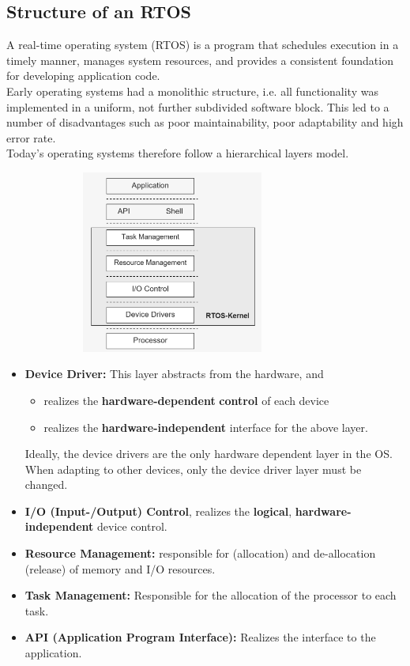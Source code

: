 \subsection{Structure of an RTOS}

A real-time operating system (RTOS) is a program that schedules execution in a timely manner, manages system resources, and provides a consistent foundation for developing application code.\\

Early operating systems had a monolithic structure, i.e. all functionality was implemented in a uniform, not further subdivided software block. This led to a number of disadvantages such as poor maintainability, poor adaptability and high error rate.\\

Today's operating systems therefore follow a hierarchical layers model. 

	\begin{figure}[h]
    \centering
    \includegraphics[width=9cm, height=6cm]{Images/image79.png}
    \label{fig:Fig }
    \end{figure}

\begin{itemize}
	\item  \textbf{Device Driver: } This layer abstracts from the hardware, and
	\begin{itemize}
		\item realizes the \textbf{hardware-dependent} \textbf{control} of each device
		\item realizes the \textbf{hardware-independent} interface for the above layer. 
	\end{itemize}

		Ideally, the device drivers are the only hardware dependent layer in the OS. When adapting to other devices, only the device driver layer must be changed.
	\item  \textbf{I/O (Input-/Output) Control}, realizes the \textbf{logical}, \textbf{hardware-independent} device control. 
	\item  \textbf{Resource Management: } responsible for (allocation) and de-allocation (release) of memory and I/O resources.
	\item  \textbf{Task Management: } Responsible for the allocation of the processor to each task. 
	\item  \textbf{API (Application Program Interface): } Realizes the interface to the application.
\end{itemize}

